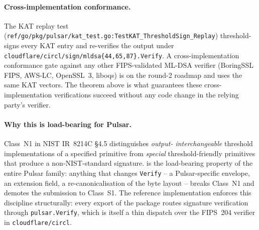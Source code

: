 \paragraph{Cross-implementation conformance.}
The KAT replay test
(\texttt{ref/go/pkg/pulsar/kat\_test.go:TestKAT\_ThresholdSign\_Replay})
threshold-signs every KAT entry and re-verifies the output under
\texttt{cloudflare/circl/sign/mldsa\{44,65,87\}.Verify}. A
cross-implementation conformance gate against any other
FIPS-validated ML-DSA verifier (BoringSSL FIPS, AWS-LC, OpenSSL~3,
liboqs) is on the round-2 roadmap and uses the same KAT vectors.
The theorem above is what guarantees these cross-implementation
verifications succeed without any code change in the relying
party's verifier.

\paragraph{Why this is load-bearing for Pulsar.}
Class~N1 in NIST IR~8214C \S4.5 distinguishes \emph{output-
interchangeable} threshold implementations of a specified primitive
from \emph{special} threshold-friendly primitives that produce a
non-NIST-standard signature. 
is the load-bearing property of the entire Pulsar family: anything
that changes \texttt{Verify} -- a Pulsar-specific envelope, an
extension field, a re-canonicalisation of the byte layout -- breaks
Class~N1 and demotes the submission to Class~S1. The reference
implementation enforces this discipline structurally: every export
of the package routes signature verification through
\texttt{pulsar.Verify}, which is itself a thin dispatch over the
FIPS~204 verifier in \texttt{cloudflare/circl}.
